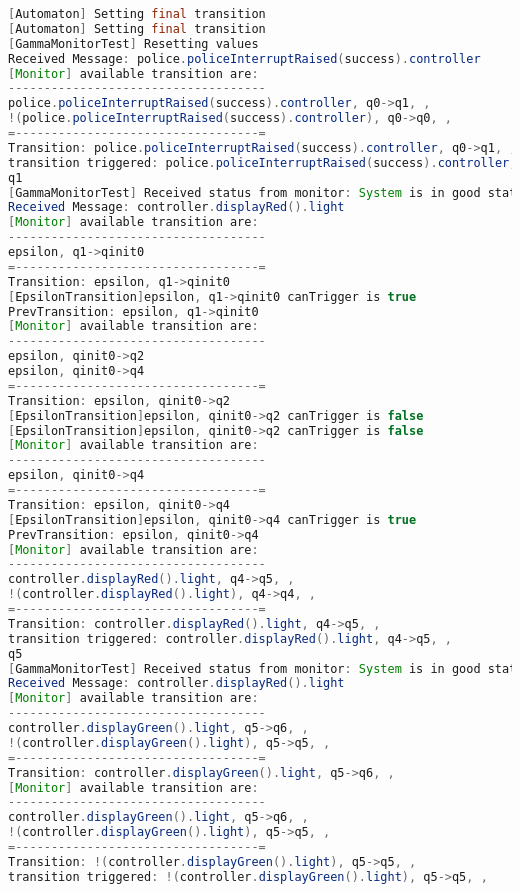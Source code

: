 \begin{lstlisting}[language=java, caption={Szenárió szöveges leírása.},captionpos=b]
[Automaton] Setting final transition
[Automaton] Setting final transition
[GammaMonitorTest] Resetting values
Received Message: police.policeInterruptRaised(success).controller
[Monitor] available transition are:
------------------------------------
police.policeInterruptRaised(success).controller, q0->q1, ,
!(police.policeInterruptRaised(success).controller), q0->q0, ,
=----------------------------------=
Transition: police.policeInterruptRaised(success).controller, q0->q1, ,
transition triggered: police.policeInterruptRaised(success).controller, q0->q1, ,
q1
[GammaMonitorTest] Received status from monitor: System is in good state.
Received Message: controller.displayRed().light
[Monitor] available transition are:
------------------------------------
epsilon, q1->qinit0
=----------------------------------=
Transition: epsilon, q1->qinit0
[EpsilonTransition]epsilon, q1->qinit0 canTrigger is true
PrevTransition: epsilon, q1->qinit0
[Monitor] available transition are:
------------------------------------
epsilon, qinit0->q2
epsilon, qinit0->q4
=----------------------------------=
Transition: epsilon, qinit0->q2
[EpsilonTransition]epsilon, qinit0->q2 canTrigger is false
[EpsilonTransition]epsilon, qinit0->q2 canTrigger is false
[Monitor] available transition are:
------------------------------------
epsilon, qinit0->q4
=----------------------------------=
Transition: epsilon, qinit0->q4
[EpsilonTransition]epsilon, qinit0->q4 canTrigger is true
PrevTransition: epsilon, qinit0->q4
[Monitor] available transition are:
------------------------------------
controller.displayRed().light, q4->q5, ,
!(controller.displayRed().light), q4->q4, ,
=----------------------------------=
Transition: controller.displayRed().light, q4->q5, ,
transition triggered: controller.displayRed().light, q4->q5, ,
q5
[GammaMonitorTest] Received status from monitor: System is in good state.
Received Message: controller.displayRed().light
[Monitor] available transition are:
------------------------------------
controller.displayGreen().light, q5->q6, ,
!(controller.displayGreen().light), q5->q5, ,
=----------------------------------=
Transition: controller.displayGreen().light, q5->q6, ,
[Monitor] available transition are:
------------------------------------
controller.displayGreen().light, q5->q6, ,
!(controller.displayGreen().light), q5->q5, ,
=----------------------------------=
Transition: !(controller.displayGreen().light), q5->q5, ,
transition triggered: !(controller.displayGreen().light), q5->q5, ,

\end{lstlisting}
